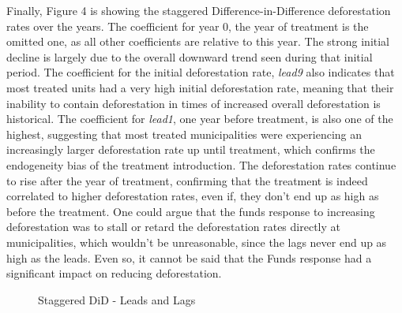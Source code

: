 \documentclass[11pt, oneside]{article}   	%
\begin{document}
Finally, Figure 4 is showing the staggered Difference-in-Difference deforestation rates over the years. The coefficient for year 0, the year of treatment is the omitted one, as all other coefficients are relative to this year. The strong initial decline is largely due to the overall downward trend seen during that initial period. The coefficient for the initial deforestation rate, \textit{lead9} also indicates that most treated units had a very high initial deforestation rate, meaning that their inability to contain deforestation in times of increased overall deforestation is historical.  The coefficient for \textit{lead1}, one year before treatment, is also one of the highest, suggesting that most treated municipalities were experiencing an increasingly larger deforestation rate up until treatment, which confirms the endogeneity bias of the treatment introduction. The deforestation rates continue to rise after the year of treatment, confirming that the treatment is indeed correlated to higher deforestation rates, even if, they don't end up as high as before the treatment. One could argue that the funds response to increasing deforestation was to stall or retard the deforestation rates directly at municipalities, which wouldn't be unreasonable, since the lags never end up as high as the leads. Even so, it cannot be said that the Funds response had a significant impact on reducing deforestation.  


\begin{figure}[!h]
\centering

\caption{Staggered DiD - Leads and Lags}
\end{figure}
\end{document}
